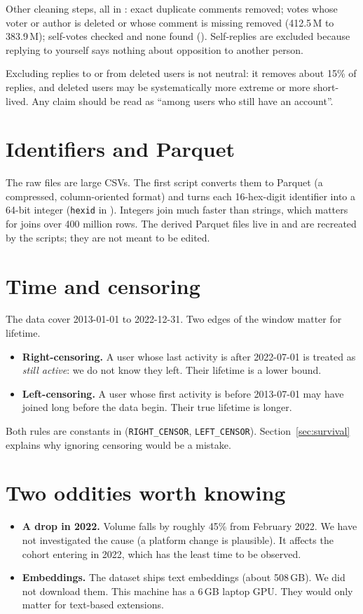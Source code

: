 Other cleaning steps, all in : exact duplicate comments removed; votes whose voter or author is deleted or whose comment is missing removed (412.5\,M to 383.9\,M); self-votes checked and none found (). Self-replies are excluded because replying to yourself says nothing about opposition to another person.

\begin{pitfall}
Excluding replies to or from deleted users is not neutral: it removes about 15\% of replies, and deleted users may be systematically more extreme or more short-lived. Any claim should be read as ``among users who still have an account''.
\end{pitfall}

\section{Identifiers and Parquet}
The raw files are large CSVs. The first script converts them to Parquet (a compressed, column-oriented format) and turns each 16-hex-digit identifier into a 64-bit integer (\texttt{hexid} in ). Integers join much faster than strings, which matters for joins over 400 million rows. The derived Parquet files live in  and are recreated by the scripts; they are not meant to be edited.

\section{Time and censoring}
The data cover 2013-01-01 to 2022-12-31. Two edges of the window matter for lifetime.
\begin{itemize}
  \item \textbf{Right-censoring.} A user whose last activity is after 2022-07-01 is treated as \emph{still active}: we do not know they left. Their lifetime is a lower bound.
  \item \textbf{Left-censoring.} A user whose first activity is before 2013-07-01 may have joined long before the data begin. Their true lifetime is longer.
\end{itemize}
Both rules are constants in  (\texttt{RIGHT\_CENSOR}, \texttt{LEFT\_CENSOR}). Section~\ref{sec:survival} explains why ignoring censoring would be a mistake.

\section{Two oddities worth knowing}
\begin{itemize}
  \item \textbf{A drop in 2022.} Volume falls by roughly 45\% from February 2022. We have not investigated the cause (a platform change is plausible). It affects the cohort entering in 2022, which has the least time to be observed.
  \item \textbf{Embeddings.} The dataset ships text embeddings (about 508\,GB). We did not download them. This machine has a 6\,GB laptop GPU. They would only matter for text-based extensions.
\end{itemize}
